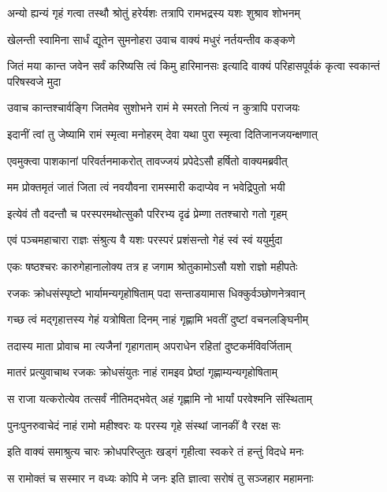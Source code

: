 \twolineshloka
{अन्यो ह्यन्यं गृहं गत्वा तस्थौ श्रोतुं हरेर्यशः}
{तत्रापि रामभद्रस्य यशः शुश्राव शोभनम्}%

\twolineshloka
{खेलन्ती स्वामिना सार्धं द्यूतेन सुमनोहरा}
{उवाच वाक्यं मधुरं नर्तयन्तीव कङ्कणे}%

\fourlineindentedshloka
{जितं मया कान्त जवेन सर्वं}
{करिष्यसि त्वं किमु हारिमानसः}
{इत्यादि वाक्यं परिहासपूर्वकं}
{कृत्वा स्वकान्तं परिषस्वजे मुदा}%

\twolineshloka
{उवाच कान्तश्चार्वङ्गि जितमेव सुशोभने}
{रामं मे स्मरतो नित्यं न कुत्रापि पराजयः}%

\twolineshloka
{इदानीं त्वां तु जेष्यामि रामं स्मृत्वा मनोहरम्}
{देवा यथा पुरा स्मृत्वा दितिजानजयन्क्षणात्}%

\twolineshloka
{एवमुक्त्वा पाशकानां परिवर्तनमाकरोत्}
{तावज्जयं प्रपेदेऽसौ हर्षितो वाक्यमब्रवीत्}%

\twolineshloka
{मम प्रोक्तमृतं जातं जिता त्वं नवयौवना}
{रामस्मारी कदाप्येव न भवेद्रिपुतो भयी}%

\twolineshloka
{इत्येवं तौ वदन्तौ च परस्परमथोत्सुकौ}
{परिरभ्य दृढं प्रेम्णा ततश्चारो गतो गृहम्}%

\twolineshloka
{एवं पञ्चमहाचारा राज्ञः संश्रुत्य वै यशः}
{परस्परं प्रशंसन्तो गेहं स्वं स्वं ययुर्मुदा}%

\twolineshloka
{एकः षष्ठश्चरः कारुगेहानालोक्य तत्र ह}
{जगाम श्रोतुकामोऽसौ यशो राज्ञो महीपतेः}%

\twolineshloka
{रजकः क्रोधसंस्पृष्टो भार्यामन्यगृहोषिताम्}
{पदा सन्ताडयामास धिक्कुर्वञ्छोणनेत्रवान्}%

\twolineshloka
{गच्छ त्वं मद्गृहात्तस्य गेहं यत्रोषिता दिनम्}
{नाहं गृह्णामि भवतीं दुष्टां वचनलङ्घिनीम्}%

\twolineshloka
{तदास्य माता प्रोवाच मा त्यजैनां गृहागताम्}
{अपराधेन रहितां दुष्टकर्मविवर्जिताम्}%

\twolineshloka
{मातरं प्रत्युवाचाथ रजकः क्रोधसंयुतः}
{नाहं रामइव प्रेष्ठां गृह्णाम्यन्यगृहोषिताम्}%

\twolineshloka
{स राजा यत्करोत्येव तत्सर्वं नीतिमद्भवेत्}
{अहं गृह्णामि नो भार्यां परवेश्मनि संस्थिताम्}%

\twolineshloka
{पुनःपुनरुवाचेदं नाहं रामो महीश्वरः}
{यः परस्य गृहे संस्थां जानकीं वै ररक्ष सः}%

\twolineshloka
{इति वाक्यं समाश्रुत्य चारः क्रोधपरिप्लुतः}
{खड्गं गृहीत्वा स्वकरे तं हन्तुं विदधे मनः}%

\twolineshloka
{स रामोक्तं च सस्मार न वध्यः कोपि मे जनः}
{इति ज्ञात्वा सरोषं तु सञ्जहार महामनाः}%

